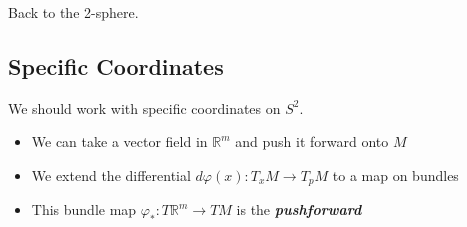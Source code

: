 \documentclass[UKenglish]{beamer}
\newcommand\boldgreen[1]{\textcolor{lighter_csu_green}{\emph{\textbf{#1}}}}
\newcommand{\R}{\mathbb{R}}
\begin{document}
\begin{frame}{}
\vfill
\begin{figure}[H]
	\centering
	\def\svgwidth{\columnwidth}
	
\end{figure}
\vfill
\end{frame}

\begin{frame}{}
	\vfill
	\centering
	Back to the 2-sphere.
	\vfill
\end{frame}

\begin{frame}{}
\vfill
\begin{figure}[H]
	\centering
	\def\svgwidth{.75\columnwidth}
	
\end{figure}
\vfill
\end{frame}

\subsection{Specific Coordinates}

\begin{frame}{}
	\vfill
	We should work with specific coordinates on $S^2$.
	\vfill
\end{frame}

\begin{frame}{}
\vfill
\begin{figure}[H]
	\centering
	\def\svgwidth{\columnwidth}
	
\end{figure}
\vfill
\end{frame}

\begin{frame}{}
\vfill
\begin{figure}[H]
	\centering
	\def\svgwidth{\columnwidth}
	
\end{figure}
\vfill
\end{frame}

\begin{frame}{}
	\vfill
	\begin{itemize}
		\item We can take a vector field in $\R^m$ and push it forward onto $M$
		\pause
		\item We extend the differential $d\varphi(x) \colon T_xM \to T_pM$ to a map on bundles
		\pause
		\item This bundle map $\varphi_* \colon T\R^m \to TM$ is the \boldgreen{pushforward}
	\end{itemize}
\end{frame}
\end{document}

